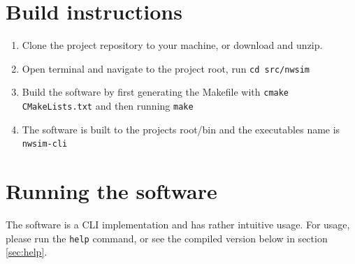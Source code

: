 \section{Build instructions}
\begin{enumerate}
    \item Clone the project repository to your machine, or download and unzip.
    \item Open terminal and navigate to the project root, run \texttt{cd src/nwsim}
    \item Build the software by first generating the Makefile with \texttt{cmake CMakeLists.txt} and then running \texttt{make}
    \item The software is built to the projects root/bin and the executables name is \texttt{nwsim-cli}
\end{enumerate}

\section{Running the software}
The software is a CLI implementation and has rather intuitive usage. For usage, please run the \texttt{help} command, or see the compiled version below in section \ref{sec:help}.

